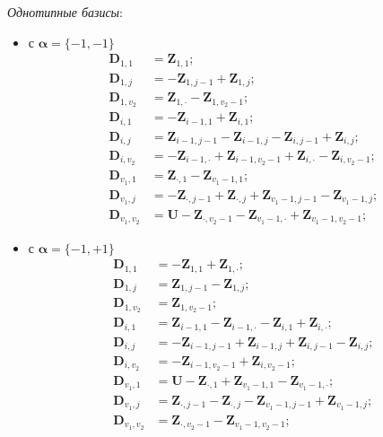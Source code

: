 \begin{multicols}{2}
  \textit{Однотипные базисы}:
  \begin{itemize}
  \item
  с $\boldsymbol{\alpha} = \{-1,-1\}$
  \begin{align*}
  \boldsymbol{D}_{1,1}& = \boldsymbol{Z}_{1,1}; \\
  \boldsymbol{D}_{1,j}& = -\boldsymbol{Z}_{1,j-1} + \boldsymbol{Z}_{1,j}; \\
  \boldsymbol{D}_{1,v_2} &= \boldsymbol{Z}_{1,\cdot} - \boldsymbol{Z}_{1,v_2-1}; \\
  \boldsymbol{D}_{i,1}& = -\boldsymbol{Z}_{i-1,1} + \boldsymbol{Z}_{i,1}; \\
  \boldsymbol{D}_{i,j}& = \boldsymbol{Z}_{i-1,j-1} - \boldsymbol{Z}_{i-1,j} - \boldsymbol{Z}_{i,j-1} + \boldsymbol{Z}_{i,j}; \\
  \boldsymbol{D}_{i,v_2} & = -\boldsymbol{Z}_{i-1,\cdot} + \boldsymbol{Z}_{i-1,v_2-1} + \boldsymbol{Z}_{i,\cdot} - 
\boldsymbol{Z}_{i,v_2-1}; \\
  \boldsymbol{D}_{v_1,1}& = \boldsymbol{Z}_{\cdot,1} - \boldsymbol{Z}_{v_1-1,1}; \\
  \boldsymbol{D}_{v_1,j} & = -\boldsymbol{Z}_{\cdot,j-1} + \boldsymbol{Z}_{\cdot,j} + \boldsymbol{Z}_{v_1-1,j-1} - 
\boldsymbol{Z}_{v_1-1,j}; \\
  \boldsymbol{D}_{v_1,v_2} & = \boldsymbol{U} - \boldsymbol{Z}_{\cdot,v_2-1} - \boldsymbol{Z}_{v_1-1,\cdot} + \boldsymbol{Z}_{v_1-
1,v_2-1}; 
  \end{align*}
  
 \item  с $\boldsymbol{\alpha} = \{-1,+1\}$ 
  \begin{align*}
  \boldsymbol{D}_{1,1}& = -\boldsymbol{Z}_{1,1} + \boldsymbol{Z}_{1,\cdot}; \\
  \boldsymbol{D}_{1,j}& = \boldsymbol{Z}_{1,j-1} - \boldsymbol{Z}_{1,j}; \\
  \boldsymbol{D}_{1,v_2} & = \boldsymbol{Z}_{1,v_2-1}; \\
  \boldsymbol{D}_{i,1} & = \boldsymbol{Z}_{i-1,1} - \boldsymbol{Z}_{i-1,\cdot} - \boldsymbol{Z}_{i,1} + \boldsymbol{Z}_{i,\cdot}; \\
  \boldsymbol{D}_{i,j} & = -\boldsymbol{Z}_{i-1,j-1} + \boldsymbol{Z}_{i-1,j} + \boldsymbol{Z}_{i,j-1} - \boldsymbol{Z}_{i,j}; \\
  \boldsymbol{D}_{i,v_2} & = -\boldsymbol{Z}_{i-1,v_2-1} + \boldsymbol{Z}_{i,v_2-1}; \\
  \boldsymbol{D}_{v_1,1} & = \boldsymbol{U} - \boldsymbol{Z}_{\cdot,1} + \boldsymbol{Z}_{v_1-1,1} - \boldsymbol{Z}_{v_1-1,\cdot};\\ 
  \boldsymbol{D}_{v_1,j} & = \boldsymbol{Z}_{\cdot,j-1} - \boldsymbol{Z}_{\cdot,j} - \boldsymbol{Z}_{v_1-1,j-1} + 
\boldsymbol{Z}_{v_1-1,j}; \\
  \boldsymbol{D}_{v_1,v_2} & = \boldsymbol{Z}_{\cdot,v_2-1} - \boldsymbol{Z}_{v_1-1,v_2-1}; 
  \end{align*}
  

\end{itemize}
\end{multicols}
